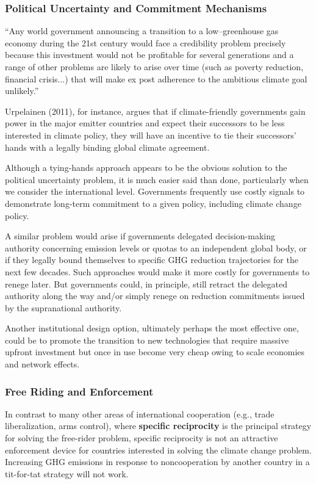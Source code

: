 \subsubsection{Political Uncertainty and Commitment Mechanisms}

“Any world government announcing a transition to a low–greenhouse gas economy during the 21st century would face a credibility problem precisely because this investment would not be profitable for several generations and a range of other problems are likely to arise over time (such as poverty reduction, financial crisis...) that will make ex post adherence to the ambitious climate goal unlikely.”

Urpelainen (2011), for instance, argues that if climate-friendly governments gain power in the major emitter countries and expect their successors to be less interested in climate policy, they will have an incentive to tie their successors' hands with a legally binding global climate agreement.

Although a tying-hands approach appears to be the obvious solution to the political uncertainty problem, it is much easier said than done, particularly when we consider the international level. Governments frequently use costly signals to demonstrate long-term commitment to a given policy, including climate change policy.

A similar problem would arise if governments delegated decision-making authority concerning emission levels or quotas to an independent global body, or if they legally bound themselves to specific GHG reduction trajectories for the next few decades. Such approaches would make it more costly for governments to renege later. But governments could, in principle, still retract the delegated authority along the way and/or simply renege on reduction commitments issued by the supranational authority.

Another institutional design option, ultimately perhaps the most effective one, could be to promote the transition to new technologies that require massive upfront investment but once in use become very cheap owing to scale economies and network effects.

\subsubsection{Free Riding and Enforcement}

In contrast to many other areas of international cooperation (e.g., trade liberalization, arms control), where \textbf{specific reciprocity} is the principal strategy for solving the free-rider problem, specific reciprocity is not an attractive enforcement device for countries interested in solving the climate change problem. Increasing GHG emissions in response to noncooperation by another country in a tit-for-tat strategy will not work.

